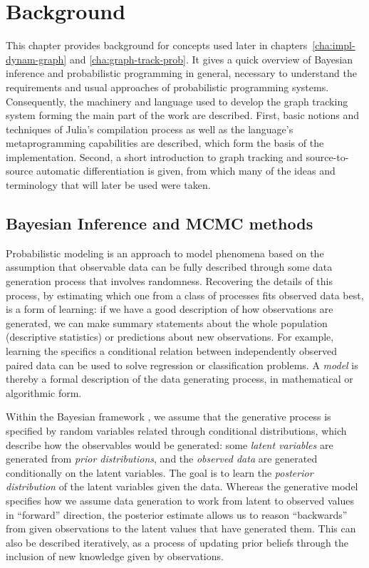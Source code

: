 \chapter{Background}
\label{cha:background}

This chapter provides background for concepts used later in chapters~\ref{cha:impl-dynam-graph} and
\ref{cha:graph-track-prob}.  It gives a quick overview of Bayesian inference and probabilistic
programming in general, necessary to understand the requirements and usual approaches of
probabilistic programming systems.  Consequently, the machinery and language used to develop the
graph tracking system forming the main part of the work are described.  First, basic notions and
techniques of Julia's compilation process as well as the language's metaprogramming capabilities are
described, which form the basis of the implementation.  Second, a short introduction to graph
tracking and source-to-source automatic differentiation is given, from which many of the ideas and
terminology that will later be used were taken.


\section{Bayesian Inference and MCMC methods}
\label{sec:bayes-infer}

Probabilistic modeling \parencite{winn2019modelbased} is an approach to model phenomena based on the
assumption that observable data can be fully described through some data generation process that
involves randomness.  Recovering the details of this process, by estimating which one from a class
of processes fits observed data best, is a form of learning: if we have a good description of how
observations are generated, we can make summary statements about the whole population (descriptive
statistics) or predictions about new observations.  For example, learning the specifics a
conditional relation between independently observed paired data can be used to solve regression or
classification problems.  A \emph{model} is thereby a formal description of the data generating
process, in mathematical or algorithmic form.

Within the Bayesian framework
\parencite{bolstad2004introduction,congdon2006bayesian,gelman2020bayesian}, we assume that the
generative process is specified by random variables related through conditional distributions, which
describe how the observables would be generated: some \emph{latent variables} are generated from
\emph{prior distributions}, and the \emph{observed data} are generated conditionally on the latent
variables.  The goal is to learn the \emph{posterior distribution} of the latent variables given the
data.  Whereas the generative model specifies how we assume data generation to work from latent to
observed values in \enquote{forward} direction, the posterior estimate allows us to reason
\enquote{backwards} from given observations to the latent values that have generated them.  This can
also be described iteratively, as a process of updating prior beliefs through the inclusion of new
knowledge given by observations.

